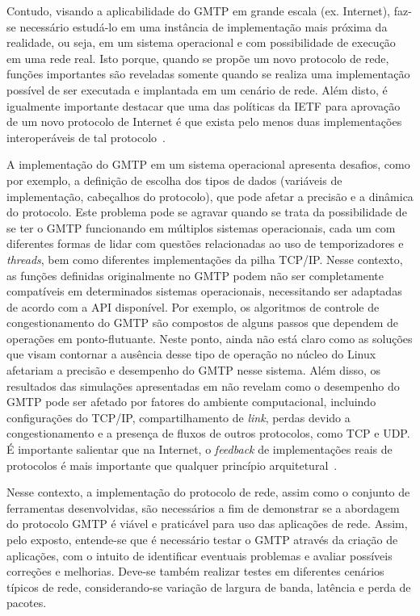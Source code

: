 Contudo, visando a aplicabilidade do GMTP em grande escala (ex. Internet), faz-se necessário estudá-lo em uma instância de implementação mais próxima da realidade, ou seja, em um sistema operacional e com possibilidade de execução em uma rede real. 
Isto porque, quando se propõe um novo protocolo de rede, funções importantes são reveladas somente quando se realiza uma implementação possível de ser executada e implantada em um cenário de rede. 
Além disto, é igualmente importante destacar que uma das políticas da IETF para aprovação de um novo protocolo de Internet é que exista pelo menos duas implementações interoperáveis de tal protocolo~\cite{RFC2026}.

A implementação do GMTP em um sistema operacional apresenta desafios, como por exemplo, a definição de escolha dos tipos de dados (variáveis de implementação, cabeçalhos do protocolo), que pode afetar a precisão e a dinâmica do protocolo.
Este problema pode se agravar quando se trata da possibilidade de se ter o GMTP funcionando em múltiplos sistemas operacionais, cada um com diferentes formas de lidar com questões relacionadas ao uso de temporizadores e \textit{threads}, bem como diferentes implementações da pilha TCP/IP.
Nesse contexto, as funções definidas originalmente no GMTP podem não ser completamente compatíveis em determinados sistemas operacionais, necessitando ser adaptadas de acordo com a API disponível.
Por exemplo, os algoritmos de controle de congestionamento do GMTP são compostos de alguns passos que dependem de operações em ponto-flutuante. Neste ponto, ainda não está claro como as soluções que visam contornar a ausência desse tipo de operação no núcleo do Linux afetariam a precisão e desempenho do GMTP nesse sistema.
Além disso, os resultados das simulações apresentadas em \cite{sales2014gmtp} não revelam como o desempenho do GMTP pode ser afetado por fatores do ambiente computacional, incluindo configurações do TCP/IP, compartilhamento de \textit{link}, perdas devido a congestionamento e a presença de fluxos de outros protocolos, como TCP e UDP.
É importante salientar que na Internet, o \textit{feedback} de implementações reais de protocolos é mais importante que qualquer princípio arquitetural~\cite{carpenter1996architectural}. 

Nesse contexto, a implementação do protocolo de rede, assim como o conjunto de ferramentas desenvolvidas, são necessários a fim de demonstrar se a abordagem do protocolo GMTP é viável e praticável para uso das aplicações de rede.
Assim, pelo exposto, entende-se que é necessário testar o GMTP através da criação de aplicações, com o intuito de identificar eventuais problemas e avaliar possíveis correções e melhorias. Deve-se também realizar testes em diferentes cenários típicos de rede, considerando-se variação de largura de banda, latência e perda de pacotes.

